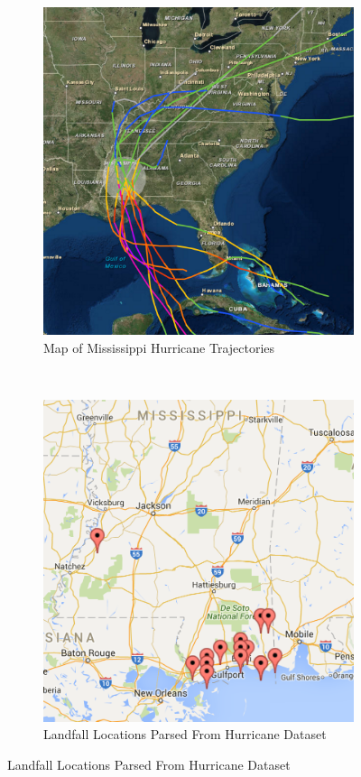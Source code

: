 \documentclass[titlepage]{article}
\begin{document}
    \begin{figure}[H]
      \center
      \begin{subfigure}[b]{0.5\textwidth}
        \center
        \includegraphics[width=\linewidth]{figures/smaller_chaos.png}
        \caption*{Map of Mississippi Hurricane Trajectories \cite{smaller_chaos}}
      \end{subfigure}~
      \begin{subfigure}[b]{0.5\textwidth}
        \center
        \includegraphics[width=\linewidth]{figures/parsed_chaos.png}
        \caption*{Landfall Locations Parsed From Hurricane Dataset \cite{fifteen}}
      \end{subfigure}
    \end{figure}
\end{document}
